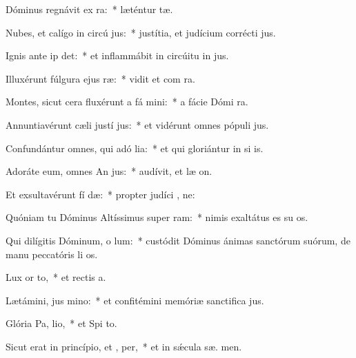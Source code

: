 \item Dóminus regnávit ex ra:~* læténtur  tæ.
\item Nubes, et calígo in circú jus:~* justítia, et judícium corrécti  jus.
\item Ignis ante ip det:~* et inflammábit in circúitu in jus.
\item Illuxérunt fúlgura ejus  ræ:~* vidit et com  ra.
\item Montes, sicut cera fluxérunt a fá mini:~* a fácie Dómi  ra.
\item Annuntiavérunt cæli justí jus:~* et vidérunt omnes pópuli  jus.
\item Confundántur omnes, qui adó lia:~* et qui gloriántur in si is.
\item Adoráte eum, omnes An jus:~* audívit, et læ  on.
\item Et exsultavérunt fí dæ:~* propter judíci , ne:
\item Quóniam tu Dóminus Altíssimus super  ram:~* nimis exaltátus es su  os.
\item Qui dilígitis Dóminum, o lum:~* custódit Dóminus ánimas sanctórum suórum, de manu peccatóris li os.
\item Lux or  to,~* et rectis  a.
\item Lætámini, jus  mino:~* et confitémini memóriæ sanctifica jus.
\item Glória Pa,  lio,~* et Spi to.
\item Sicut erat in princípio, et ,  per,~* et in sǽcula sæ. men.

